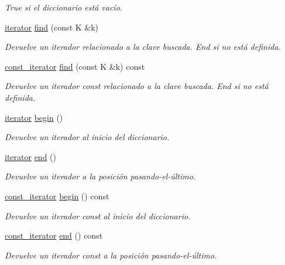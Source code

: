 \begin{DoxyCompactItemize}
\begin{DoxyCompactList}\small\item\em True si el diccionario está vacío. \end{DoxyCompactList}\item 
\hyperlink{classTrie_1_1iterator}{iterator} \hyperlink{classTrie_a283dd74c28dbd89170d0a6c1070df7a1}{find} (const K \&k)
\begin{DoxyCompactList}\small\item\em Devuelve un iterador relacionado a la clave buscada. End si no está definida. \end{DoxyCompactList}\item 
\hyperlink{classTrie_1_1const__iterator}{const\-\_\-iterator} \hyperlink{classTrie_a87ff3465e7a68808adbed990372f9adf}{find} (const K \&k) const 
\begin{DoxyCompactList}\small\item\em Devuelve un iterador const relacionado a la clave buscada. End si no está definida. \end{DoxyCompactList}\item 
\hyperlink{classTrie_1_1iterator}{iterator} \hyperlink{classTrie_a46ff79fbdf4bc9b41d00a8bd249cf982}{begin} ()
\begin{DoxyCompactList}\small\item\em Devuelve un iterador al inicio del diccionario. \end{DoxyCompactList}\item 
\hyperlink{classTrie_1_1iterator}{iterator} \hyperlink{classTrie_ac7804a9427e5368793f18f02dcdf4140}{end} ()
\begin{DoxyCompactList}\small\item\em Devuelve un iterador a la posición pasando-\/el-\/último. \end{DoxyCompactList}\item 
\hyperlink{classTrie_1_1const__iterator}{const\-\_\-iterator} \hyperlink{classTrie_a68fe48b7794a86441af9855d5e99d856}{begin} () const 
\begin{DoxyCompactList}\small\item\em Devuelve un iterador const al inicio del diccionario. \end{DoxyCompactList}\item 
\hyperlink{classTrie_1_1const__iterator}{const\-\_\-iterator} \hyperlink{classTrie_ac2b1fb8c1a173a46af45415dd0bd7abb}{end} () const 
\begin{DoxyCompactList}\small\item\em Devuelve un iterador const a la posición pasando-\/el-\/último. \end{DoxyCompactList}\item 

\end{DoxyCompactItemize}
